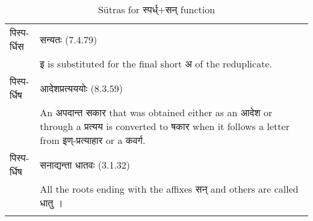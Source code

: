 \begin{longtable}{ |p{1.4cm}|p{14.6cm}| }
			\\\hline
			\rowcolor{green!10}
			\texthindi{पिस्पर्धिस}
			&\texthindi{सन्यतः} (7.4.79)\\
			\rowcolor{green!10}
			&\texthindi{इ} is substituted for the final short \texthindi{अ} of the reduplicate. 
			\\\hline
			\rowcolor{green!10}
			\texthindi{पिस्पर्धिष}
			&\texthindi{आदेशप्रत्यययोः} (8.3.59)\\
			\rowcolor{green!10}
			&An \texthindi{अपदान्त सकार} that was obtained either as an \texthindi{आदेश} or through a \texthindi{प्रत्यय} is converted to \texthindi{षकार} when it follows a letter from \texthindi{इण्-प्रत्याहार} or a \texthindi{कवर्ग}.
			\\\hline
			\rowcolor{green!10}
			\texthindi{पिस्पर्धिष}
			&\texthindi{सनाद्यन्ता धातवः} (3.1.32)\\
			\rowcolor{green!10}
			&All the roots ending with the affixes \texthindi{सन्} and others are called \texthindi{धातु} ।
			\\\hline
		
		\caption{Sūtras for \texthindi{स्पर्ध्$+$सन्} function}
		\label{table:a17}
		\end{longtable}


